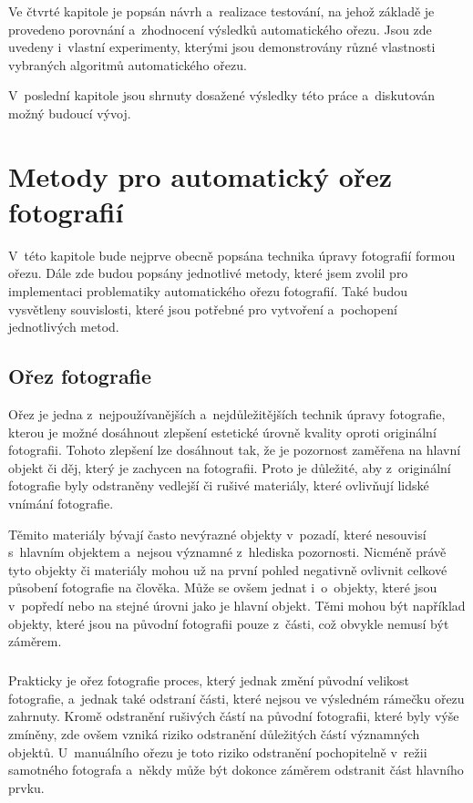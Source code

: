 Ve čtvrté kapitole je popsán návrh a~realizace testování, na jehož základě je provedeno porovnání a~zhodnocení výsledků automatického ořezu. Jsou zde uvedeny i~vlastní experimenty, kterými jsou demonstrovány různé vlastnosti vybraných algoritmů automatického ořezu.

V~poslední kapitole jsou shrnuty dosažené výsledky této práce a~diskutován možný budoucí vývoj.


\chapter{Metody pro automatický ořez fotografií}
\label{chapter:2}
V~této kapitole bude nejprve obecně popsána technika úpravy fotografií formou ořezu. Dále zde budou popsány jednotlivé metody, které jsem zvolil pro implementaci problematiky automatického ořezu fotografií. Také budou vysvětleny souvislosti, které jsou potřebné pro vytvoření a~pochopení jednotlivých metod.

\section{Ořez fotografie}
Ořez je jedna z~nejpoužívanějších a~nejdůležitějších technik úpravy fotografie, kterou je možné dosáhnout zlepšení estetické úrovně kvality oproti originální fotografii. Tohoto zlepšení lze dosáhnout tak, že je pozornost zaměřena na hlavní objekt či děj, který je zachycen na fotografii. Proto je důležité, aby z~originální fotografie byly odstraněny vedlejší či rušivé materiály, které ovlivňují lidské vnímání fotografie. 

Těmito materiály bývají často nevýrazné objekty v~pozadí, které nesouvisí s~hlavním objektem a~nejsou významné z~hlediska pozornosti. Nicméně právě tyto objekty či materiály mohou už na první pohled negativně ovlivnit celkové působení fotografie na člověka. Může se ovšem jednat i~o~objekty, které jsou v~popředí nebo na stejné úrovni jako je hlavní objekt. Těmi mohou být například objekty, které jsou na původní fotografii pouze z~části, což obvykle nemusí být záměrem. 

\paragraph{}
Prakticky je ořez fotografie proces, který jednak změní původní velikost fotografie, a~jednak také odstraní části, které nejsou ve výsledném rámečku ořezu zahrnuty. Kromě odstranění rušivých částí na původní fotografii, které byly výše zmíněny, zde ovšem vzniká riziko odstranění důležitých částí významných objektů. U~manuálního ořezu je toto riziko odstranění pochopitelně v~režii samotného fotografa a~někdy může být dokonce záměrem odstranit část hlavního prvku. 

